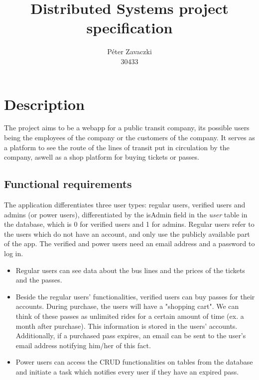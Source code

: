 \documentclass[a4paper,12pt]{report}
\title{Distributed Systems project specification}
\author{Péter Zavaczki\\30433}
\begin{document}
\maketitle

\chapter{Description}
The project aims to be a webapp for a public transit company, its possible users being the employees of the company or the customers of the company.
It serves as a platform to see the route of the lines of transit put in circulation by the company, aswell as a shop platform for buying tickets or passes.

\section{Functional requirements}
The application differentiates three user types: regular users, verified users and admins (or power users), differentiated by the isAdmin field in the \textit{user} table in the database, which is 0 for verified users and 1 for admins.
Regular users refer to the users which do not have an account, and only use the publicly available part of the app.
The verified and power users need an email address and a password to log in.

\begin{itemize}
    \item Regular users can see data about the bus lines and the prices of the tickets and the passes.
    \item Beside the regular users' functionalities, verified users can buy passes for their accounts.
    During purchase, the users will have a "shopping cart".
    We can think of these passes as unlimited rides for a certain amount of time (ex. a month after purchase).
    This information is stored in the users' accounts.
    Additionally, if a purchased pass expires, an email can be sent to the user's email address notifying him/her of this fact.
    \item Power users can access the CRUD functionalities on tables from the database and initiate a task which notifies every user if they have an expired pass.
\end{itemize}
\end{document}
